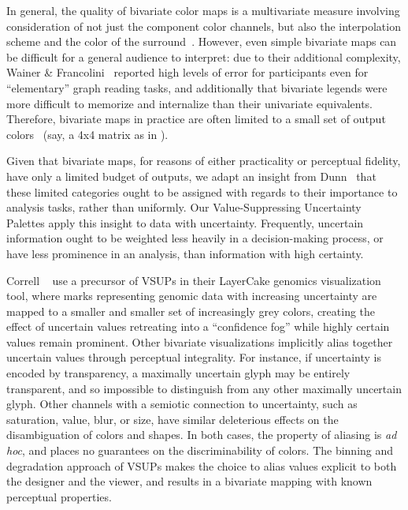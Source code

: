 In general, the quality of bivariate color maps is a multivariate measure involving consideration of not just the component color channels, but also the interpolation scheme and the color of the surround~\cite{bernard2015survey}. However, even simple bivariate maps can be difficult for a general audience to interpret: due to their additional complexity, Wainer \& Francolini~\cite{wainer1980empirical} reported high levels of error for participants even for ``elementary'' graph reading tasks, and additionally that bivariate legends were more difficult to memorize and internalize than their univariate equivalents. Therefore, bivariate maps in practice are often limited to a small set of output colors~\cite{robertson1986generation,trumbo1981theory} (say, a 4x4 matrix as in ).

Given that bivariate maps, for reasons of either practicality or perceptual fidelity, have only a limited budget of outputs, we adapt an insight from Dunn~\cite{dunn1989dynamic} that these limited categories ought to be assigned with regards to their importance to analysis tasks, rather than uniformly. Our Value-Suppressing Uncertainty Palettes apply this insight to data with uncertainty. Frequently, uncertain information ought to be weighted less heavily in a decision-making process, or have less prominence in an analysis, than information with high certainty.

Correll \ea~\cite{correll2015layercake,correll2011visualizing} use a precursor of VSUPs in their LayerCake genomics visualization tool, where marks representing genomic data with increasing uncertainty are mapped to a smaller and smaller set of increasingly grey colors, creating the effect of uncertain values retreating into a ``confidence fog'' while highly certain values remain prominent. Other bivariate visualizations implicitly alias together uncertain values through perceptual integrality. For instance, if uncertainty is encoded by transparency, a maximally uncertain glyph may be entirely transparent, and so impossible to distinguish from any other maximally uncertain glyph. Other channels with a semiotic connection to uncertainty, such as saturation, value, blur, or size, have similar deleterious effects on the disambiguation of colors and shapes. In both cases, the property of aliasing is \emph{ad hoc}, and places no guarantees on the discriminability of colors. The binning and degradation approach of VSUPs makes the choice to alias values explicit to both the designer and the viewer, and results in a bivariate mapping with known perceptual properties.

